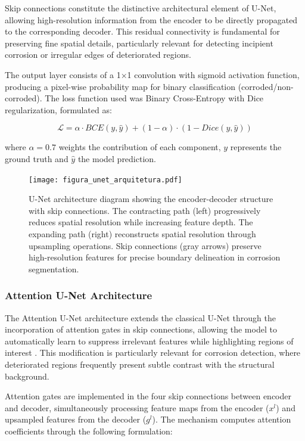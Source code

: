 \documentclass[12pt,a4paper,twoside]{article}
\begin{document}
Skip connections constitute the distinctive architectural element of U-Net, allowing high-resolution information from the encoder to be directly propagated to the corresponding decoder. This residual connectivity is fundamental for preserving fine spatial details, particularly relevant for detecting incipient corrosion or irregular edges of deteriorated regions.

The output layer consists of a 1×1 convolution with sigmoid activation function, producing a pixel-wise probability map for binary classification (corroded/non-corroded). The loss function used was Binary Cross-Entropy with Dice regularization, formulated as:

\begin{equation}
\mathcal{L} = \alpha \cdot BCE(y, \hat{y}) + (1-\alpha) \cdot (1 - Dice(y, \hat{y}))
\end{equation}

where $\alpha = 0.7$ weights the contribution of each component, $y$ represents the ground truth and $\hat{y}$ the model prediction.

\begin{figure}[H]
    \centering
    \texttt{[image: figura\_unet\_arquitetura.pdf]}
    \caption{U-Net architecture diagram showing the encoder-decoder structure with skip connections. The contracting path (left) progressively reduces spatial resolution while increasing feature depth. The expanding path (right) reconstructs spatial resolution through upsampling operations. Skip connections (gray arrows) preserve high-resolution features for precise boundary delineation in corrosion segmentation.}
    \label{fig:unet_architecture}
\end{figure}

\subsubsection{Attention U-Net Architecture}
\label{subsubsec:attention_unet}

The Attention U-Net architecture extends the classical U-Net through the incorporation of attention gates in skip connections, allowing the model to automatically learn to suppress irrelevant features while highlighting regions of interest \cite{oktay2018attention}. This modification is particularly relevant for corrosion detection, where deteriorated regions frequently present subtle contrast with the structural background.

Attention gates are implemented in the four skip connections between encoder and decoder, simultaneously processing feature maps from the encoder ($x^l$) and upsampled features from the decoder ($g^l$). The mechanism computes attention coefficients through the following formulation:
\end{document}
